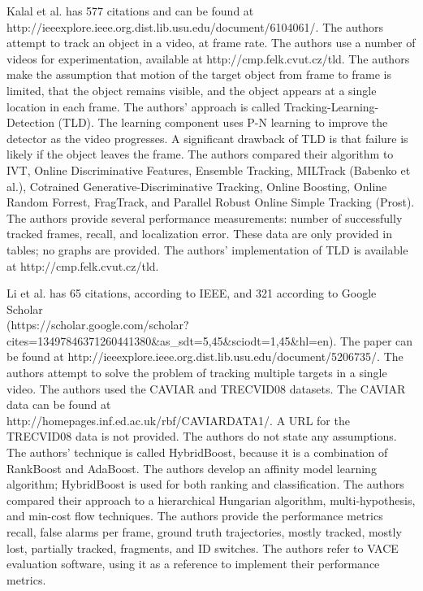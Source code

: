 \documentclass[11pt]{article}
\begin{document}
Kalal et al. \cite{6104061} has 577 citations and can be found at \\
http://ieeexplore.ieee.org.dist.lib.usu.edu/document/6104061/. The authors
attempt to track an object in a video, at frame rate. The authors use a number
of videos for experimentation, available at http://cmp.felk.cvut.cz/tld. The
authors make the assumption that motion of the target object from frame to frame
is limited, that the object remains visible, and the object appears at a single
location in each frame. The authors' approach is called
Tracking-Learning-Detection (TLD). The learning component uses P-N learning to
improve the detector as the video progresses. A significant drawback of TLD is
that failure is likely if the object leaves the frame. The authors compared
their algorithm to IVT, Online Discriminative Features, Ensemble Tracking,
MILTrack (Babenko et al.), Cotrained Generative-Discriminative Tracking, Online
Boosting, Online Random Forrest, FragTrack, and Parallel Robust Online Simple
Tracking (Prost). The authors provide several performance measurements: number
of successfully tracked frames, recall, and localization error. These data are
only provided in tables; no graphs are provided. The authors' implementation of
TLD is available at http://cmp.felk.cvut.cz/tld.

Li et al. \cite{5206735} has 65 citations, according to IEEE, and 321 according
to Google Scholar \\
(https://scholar.google.com/scholar?cites=13497846371260441380\&as\_sdt=5,45\&sciodt=1,45\&hl=en).
The paper can be found at
http://ieeexplore.ieee.org.dist.lib.usu.edu/document/5206735/. The authors
attempt to solve the problem of tracking multiple targets in a single video. The
authors used the CAVIAR and TRECVID08 datasets. The CAVIAR data can be found at
\\ http://homepages.inf.ed.ac.uk/rbf/CAVIARDATA1/. A URL for the TRECVID08 data
is not provided. The authors do not state any assumptions. The authors'
technique is called HybridBoost, because it is a combination of RankBoost and
AdaBoost. The authors develop an affinity model learning algorithm; HybridBoost
is used for both ranking and classification. The authors compared their approach
to a hierarchical Hungarian algorithm, multi-hypothesis, and min-cost flow
techniques. The authors provide the performance metrics recall, false alarms per
frame, ground truth trajectories, mostly tracked, mostly lost, partially
tracked, fragments, and ID switches. The authors refer to VACE evaluation
software, using it as a reference to implement their performance metrics.



\end{document}
